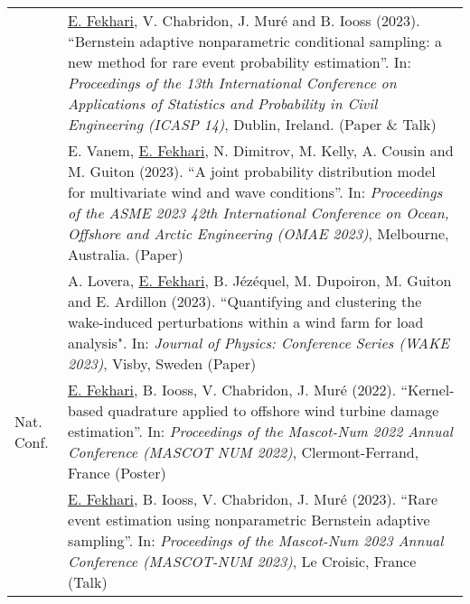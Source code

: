 \begin{table*}[h]
\begin{tabularx}{\textwidth}{l X}
                    & \underline{E. Fekhari}, V. Chabridon, J. Muré and B. Iooss (2023). 
                    ``Bernstein adaptive nonparametric conditional sampling: a new method for rare event probability estimation''.
                    In: \textit{Proceedings of the 13th International Conference on Applications of Statistics and Probability in Civil Engineering (ICASP 14)}, Dublin, Ireland. (Paper \& Talk)\\
        
                    & E. Vanem, \underline{E. Fekhari}, N. Dimitrov, M. Kelly, A. Cousin and M. Guiton (2023). 
                    ``A joint probability distribution model for multivariate wind and wave conditions''.
                    In: \textit{Proceedings of the ASME 2023 42th International Conference on Ocean, Offshore and Arctic Engineering (OMAE 2023)}, Melbourne, Australia. (Paper)\\
        
                    & A. Lovera, \underline{E. Fekhari}, B. Jézéquel, M. Dupoiron, M. Guiton and E. Ardillon (2023). 
                    ``Quantifying and clustering the wake-induced perturbations within a wind farm for load analysis". 
                    In: \textit{Journal of Physics: Conference Series (WAKE 2023)}, Visby, Sweden (Paper)\\
        \hline
        Nat. Conf.  & \underline{E. Fekhari}, B. Iooss, V. Chabridon, J. Muré (2022).
                    ``Kernel-based quadrature applied to offshore wind turbine damage estimation''. 
                    In: \textit{Proceedings of the Mascot-Num 2022 Annual Conference (MASCOT NUM 2022)}, Clermont-Ferrand, France (Poster)\\
        
                    & \underline{E. Fekhari}, B. Iooss, V. Chabridon, J. Muré (2023).
                    ``Rare event estimation using nonparametric Bernstein adaptive sampling''. 
                    In: \textit{Proceedings of the Mascot-Num 2023 Annual Conference (MASCOT-NUM 2023)}, Le Croisic, France (Talk)\\
                    
        \end{tabularx}    
\end{table*}

